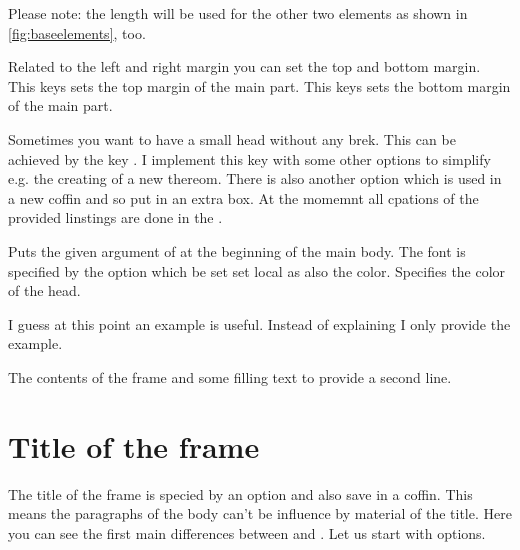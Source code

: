 \documentclass[openany,12pt,tocdepth=3]{ltx-md}
\begin{document}
\faArrowRight Please note: the length will be used for the other two elements as shown in 
\autoref{fig:baseelements}, too.

 Related to the left and right margin you can set the top and bottom margin.
This keys sets the top margin of the main part.
This keys sets the bottom margin of the main part.


Sometimes you want to have a small head without any brek. This
can be achieved by the key . I implement this key with 
some other options to simplify e.g. the creating of a new thereom. There
is also another option  which is used in a new coffin and
so put in an extra box. At the momemnt all cpations of the provided linstings
are done in the . 


Puts the given argument of  at the beginning
of the main body.
The font is specified by the option  which be set set local as
also the color.
Specifies the color of the head.


I guess at this point an example is useful. Instead of explaining I 
only provide the example.

\begin{ltxexample}[caption={Example main part},label=main,result=true]
 \begin{xframed}[%
   line-width=4pt,line-color=blue,
   inner-margin=1cm,font-color=blue!70,
   head={Example of Head},head-font-color={red!70},
   margin=1.5cm,bg-color=yellow!20,
  ]
   The contents of the frame and some filling text to 
  provide a second line.
 \end{xframed}
\end{ltxexample}


\section{Title of the frame}\label{sec:element-firsttitle}
The title of the frame is specied by an option and also save in a coffin. 
This means the paragraphs of the body can't be influence by material
of the title. Here you can see the first main differences between
 and . Let us start with options.
\end{document}
